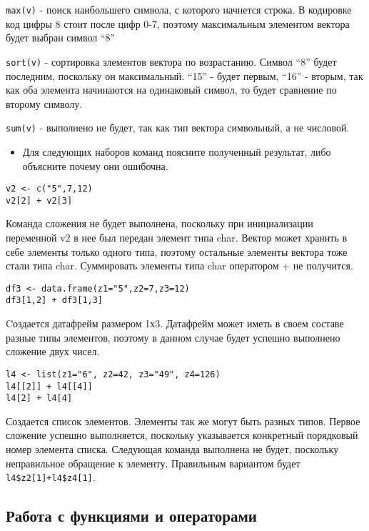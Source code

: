 \documentclass[]{article}
\providecommand{\tightlist}{%
  \setlength{\itemsep}{0pt}\setlength{\parskip}{0pt}}
\begin{document}
\texttt{max(v)} - поиск наибольшего символа, с которого начнется строка.
В кодировке код цифры 8 стоит после цифр 0-7, поэтому максимальным
элементом вектора будет выбран символ ``8''

\texttt{sort(v)} - сортировка элементов вектора по возрастанию. Символ
``8'' будет последним, поскольку он максимальный. ``15'' - будет первым,
``16'' - вторым, так как оба элемента начинаются на одинаковый символ,
то будет сравнение по второму символу.

\texttt{sum(v)} - выполнено не будет, так как тип вектора символьный, а
не числовой.

\begin{itemize}
\tightlist
\item
  Для следующих наборов команд поясните полученный результат, либо
  объясните почему они ошибочна.
\end{itemize}

\begin{verbatim}
v2 <- c("5",7,12)
v2[2] + v2[3]
\end{verbatim}

Команда сложения не будет выполнена, поскольку при инициализации
переменной v2 в нее был передан элемент типа char. Вектор может хранить
в себе элементы только одного типа, поэтому остальные элементы вектора
тоже стали типа char. Суммировать элементы типа char оператором + не
получится.

\begin{verbatim}
df3 <- data.frame(z1="5",z2=7,z3=12)
df3[1,2] + df3[1,3]
\end{verbatim}

Cоздается датафрейм размером 1х3. Датафрейм может иметь в своем составе
разные типы элементов, поэтому в данном случае будет успешно выполнено
сложение двух чисел.

\begin{verbatim}
l4 <- list(z1="6", z2=42, z3="49", z4=126)
l4[[2]] + l4[[4]]
l4[2] + l4[4]
\end{verbatim}

Создается список элементов. Элементы так же могут быть разных типов.
Первое сложение успешно выполняется, поскольку указывается конкретный
порядковый номер элемента списка. Следующая команда выполнена не будет,
поскольку неправильное обращение к элементу. Правильным вариантом будет
\texttt{l4\$z2{[}1{]}+l4\$z4{[}1{]}}.

\subsection{Работа с функциями и операторами}\label{----}
\end{document}
